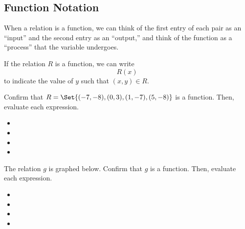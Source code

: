 \subsection{Function Notation} 
When a relation is a function, we can think of the first entry of each pair as an ``input'' and the second entry as an ``output,'' and think of the function as a ``process'' that the variable undergoes.
\begin{definition}
If the relation $R$ is a function, we can write $$R(x)$$ to indicate the value of $y$ such that $(x,y)\in R$.
\end{definition}
\begin{Example}
Confirm that $R=\Set{(-7,-8),(0,3),(1,-7),(5,-8)}$ is a function. Then, evaluate each expression.
\begin{itemize}
\item {}
\item {}
\item {}
\item {}
\end{itemize}
\end{Example}
\begin{Example}
The relation $g$ is graphed below. Confirm that $g$ is a function. Then, evaluate each expression.
\begin{center}
\end{center}
\begin{itemize}
\item {}
\item {}
\item {}
\item {}
\end{itemize}
\end{Example}
